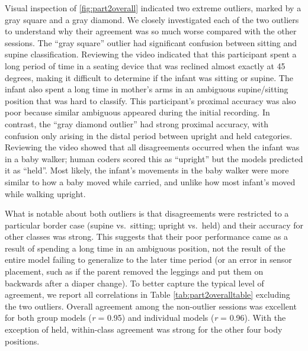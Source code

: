 \documentclass[
  man]{apa6}
\begin{document}
Visual inspection of \ref{fig:part2overall} indicated two extreme outliers, marked by a gray square and a gray diamond. We closely investigated each of the two outliers to understand why their agreement was so much worse compared with the other sessions. The ``gray square'' outlier had significant confusion between sitting and supine classification. Reviewing the video indicated that this participant spent a long period of time in a seating device that was reclined almost exactly at 45 degrees, making it difficult to determine if the infant was sitting or supine. The infant also spent a long time in mother's arms in an ambiguous supine/sitting position that was hard to classify. This participant's proximal accuracy was also poor because similar ambiguous appeared during the initial recording. In contrast, the ``gray diamond outlier'' had strong proximal accuracy, with confusion only arising in the distal period between upright and held categories. Reviewing the video showed that all disagreements occurred when the infant was in a baby walker; human coders scored this as ``upright'' but the models predicted it as ``held''. Most likely, the infant's movements in the baby walker were more similar to how a baby moved while carried, and unlike how most infant's moved while walking upright.

What is notable about both outliers is that disagreements were restricted to a particular border case (supine vs.~sitting; upright vs.~held) and their accuracy for other classes was strong. This suggests that their poor performance came as a result of spending a long time in an ambiguous position, not the result of the entire model failing to generalize to the later time period (or an error in sensor placement, such as if the parent removed the leggings and put them on backwards after a diaper change). To better capture the typical level of agreement, we report all correlations in Table \ref{tab:part2overalltable} excluding the two outliers. Overall agreement among the non-outlier sessions was excellent for both group models (\emph{r} = 0.95) and individual models (\emph{r} = 0.96). With the exception of held, within-class agreement was strong for the other four body positions.
\end{document}
